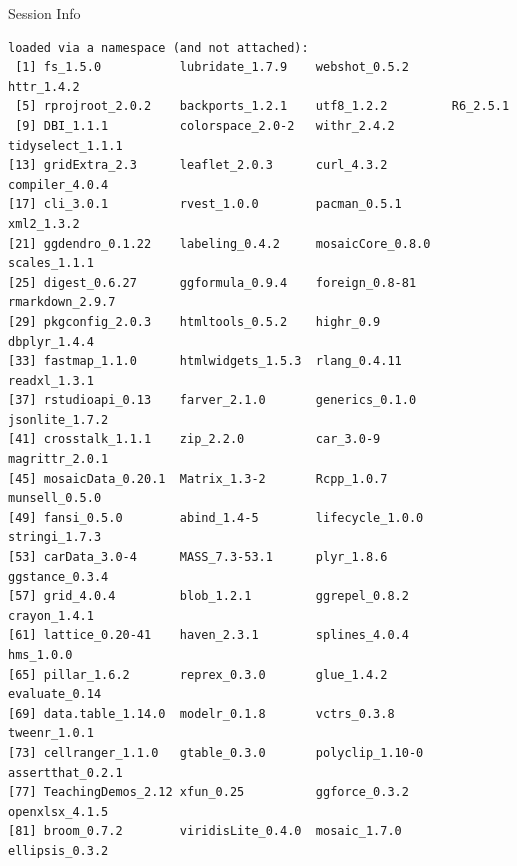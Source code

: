 \documentclass[10pt]{beamer}\usepackage[]{graphicx}\usepackage[]{color}
\makeatletter
\newenvironment{kframe}{%
 \def\at@end@of@kframe{}%
 \ifinner\ifhmode%
  \def\at@end@of@kframe{\end{minipage}}%
  \begin{minipage}{\columnwidth}%
 \fi\fi%
 \def\FrameCommand##1{\hskip\@totalleftmargin \hskip-\fboxsep
 \colorbox{shadecolor}{##1}\hskip-\fboxsep
     \hskip-\linewidth \hskip-\@totalleftmargin \hskip\columnwidth}%
 \MakeFramed {\advance\hsize-\width
   \@totalleftmargin\z@ \linewidth\hsize
   \@setminipage}}%
 {\par\unskip\endMakeFramed%
 \at@end@of@kframe}
\newenvironment{knitrout}{}{} %
\makeatother
\begin{document}
\begin{frame}[fragile]{Session Info}
\begin{knitrout}
\begin{kframe}
\begin{verbatim}
loaded via a namespace (and not attached):
 [1] fs_1.5.0           lubridate_1.7.9    webshot_0.5.2      httr_1.4.2        
 [5] rprojroot_2.0.2    backports_1.2.1    utf8_1.2.2         R6_2.5.1          
 [9] DBI_1.1.1          colorspace_2.0-2   withr_2.4.2        tidyselect_1.1.1  
[13] gridExtra_2.3      leaflet_2.0.3      curl_4.3.2         compiler_4.0.4    
[17] cli_3.0.1          rvest_1.0.0        pacman_0.5.1       xml2_1.3.2        
[21] ggdendro_0.1.22    labeling_0.4.2     mosaicCore_0.8.0   scales_1.1.1      
[25] digest_0.6.27      ggformula_0.9.4    foreign_0.8-81     rmarkdown_2.9.7   
[29] pkgconfig_2.0.3    htmltools_0.5.2    highr_0.9          dbplyr_1.4.4      
[33] fastmap_1.1.0      htmlwidgets_1.5.3  rlang_0.4.11       readxl_1.3.1      
[37] rstudioapi_0.13    farver_2.1.0       generics_0.1.0     jsonlite_1.7.2    
[41] crosstalk_1.1.1    zip_2.2.0          car_3.0-9          magrittr_2.0.1    
[45] mosaicData_0.20.1  Matrix_1.3-2       Rcpp_1.0.7         munsell_0.5.0     
[49] fansi_0.5.0        abind_1.4-5        lifecycle_1.0.0    stringi_1.7.3     
[53] carData_3.0-4      MASS_7.3-53.1      plyr_1.8.6         ggstance_0.3.4    
[57] grid_4.0.4         blob_1.2.1         ggrepel_0.8.2      crayon_1.4.1      
[61] lattice_0.20-41    haven_2.3.1        splines_4.0.4      hms_1.0.0         
[65] pillar_1.6.2       reprex_0.3.0       glue_1.4.2         evaluate_0.14     
[69] data.table_1.14.0  modelr_0.1.8       vctrs_0.3.8        tweenr_1.0.1      
[73] cellranger_1.1.0   gtable_0.3.0       polyclip_1.10-0    assertthat_0.2.1  
[77] TeachingDemos_2.12 xfun_0.25          ggforce_0.3.2      openxlsx_4.1.5    
[81] broom_0.7.2        viridisLite_0.4.0  mosaic_1.7.0       ellipsis_0.3.2    
\end{verbatim}
\end{kframe}
\end{knitrout}
	
\end{frame}
\end{document}
